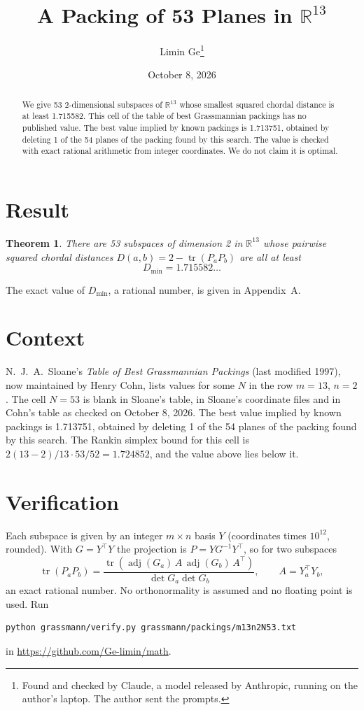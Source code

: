 \documentclass[11pt,a4paper]{article}
\title{A Packing of 53 Planes in $\mathbb{R}^{13}$}
\author{Limin Ge\thanks{Found and checked by Claude, a model released by Anthropic, running on the author's laptop. The author sent the prompts.}}
\date{October 8, 2026}
\newtheorem*{theorem}{Theorem}
\begin{document}
\maketitle
\begin{abstract}
We give 53 2-dimensional subspaces of $\mathbb{R}^{13}$ whose smallest squared chordal distance is at least 1.715582. This cell of the table of best Grassmannian packings has no published value. The best value implied by known packings is 1.713751, obtained by deleting 1 of the 54 planes of the packing found by this search. The value is checked with exact rational arithmetic from integer coordinates. We do not claim it is optimal.
\end{abstract}

\section{Result}
\begin{theorem}
There are 53 subspaces of dimension 2 in $\mathbb{R}^{13}$ whose pairwise squared chordal distances $D(a,b) = 2 - \operatorname{tr}(P_aP_b)$ are all at least
\[ D_{\min} = 1.715582\ldots \]
\end{theorem}
The exact value of $D_{\min}$, a rational number, is given in Appendix~A.


\section{Context}
N.~J.~A.~Sloane's \emph{Table of Best Grassmannian Packings} (last modified 1997), now maintained by Henry Cohn, lists values for some $N$ in the row $m=13$, $n=2$. The cell $N=53$ is blank in Sloane's table, in Sloane's coordinate files and in Cohn's table as checked on October 8, 2026. The best value implied by known packings is 1.713751, obtained by deleting 1 of the 54 planes of the packing found by this search. The Rankin simplex bound for this cell is $2(13-2)/13\cdot 53/52 = 1.724852$, and the value above lies below it.


\section{Verification}
Each subspace is given by an integer $m\times n$ basis $Y$ (coordinates times $10^{12}$, rounded). With $G=Y^\top Y$ the projection is $P=YG^{-1}Y^\top$, so for two subspaces
\[ \operatorname{tr}(P_aP_b)=\frac{\operatorname{tr}(\operatorname{adj}(G_a)\,A\,\operatorname{adj}(G_b)\,A^\top)}{\det G_a\det G_b},\qquad A=Y_a^\top Y_b, \]
an exact rational number. No orthonormality is assumed and no floating point is used. Run
\begin{verbatim}
python grassmann/verify.py grassmann/packings/m13n2N53.txt
\end{verbatim}
in \url{https://github.com/Ge-limin/math}.
\end{document}
